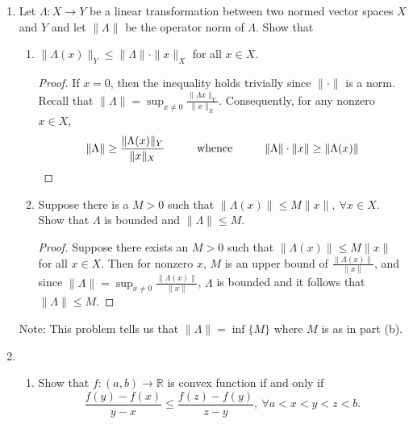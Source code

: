 \documentclass[11pt,oneside,english]{amsart}
\theoremstyle{definition}
\newcommand{\pspace}{\hspace{10mm}}
\newcommand{\MB}[1]{\mathbb{#1}}
\begin{document}
\rightline{\today}



\vspace{5mm}
\begin{enumerate}
\itemsep7mm



\item  Let $\Lambda: X\to Y$ be a linear transformation between two normed vector spaces $X$ and $Y$ and let $\|\Lambda\|$ be the operator norm of $\Lambda$. Show that 
\begin{enumerate}
\item $\|\Lambda(x)\|_Y\le \|\Lambda\|\cdot\|x\|_X$ for all $x\in X$. 

\begin{proof}
If $x=0$, then the inequality holds trivially since $\|\cdot\|$ is a norm. Recall that $\|\Lambda\|=\sup_{x\neq 0}\frac{\|\Lambda x\|_Y}{\|x\|_X}$. Consequently, for any nonzero $x\in X$,
\[
\|\Lambda\|\geq\frac{\|\Lambda (x)\|_Y}{\|x\|_X}\pspace\text{whence}\pspace\|\Lambda\|\cdot\|x\|\geq \|\Lambda(x)\|
\]
\end{proof}

\item Suppose there is a $M>0$ such that $\|\Lambda(x)\|\le M\|x\|,\ \forall x\in X.$ Show that $\Lambda$ is bounded and $\|\Lambda\|\le M$.

\begin{proof}
Suppose there exists an $M>0$ such that $\|\Lambda(x)\|\leq M\|x\|$ for all $x\in X$. Then for nonzero $x$, $M$ is an upper bound of $\frac{\|\Lambda(x)\|}{\|x\|}$, and since $\|\Lambda\|=\sup_{x\neq0}\frac{\|\Lambda(x)\|}{\|x\|}$, $\Lambda$ is bounded and it follows that $\|\Lambda\|\leq M$.
\end{proof}
\end{enumerate}

Note: This problem tells us that $\|\Lambda\|=\inf\{M\}$ where $M$ is as in part (b).

\pagebreak

\item \begin{enumerate}\itemsep7mm \item Show that $f:(a,b)\to\MB{R}$ is convex function if and only if 
\[
\frac{f(y)-f(x)}{y-x}\le \frac{f(z)-f(y)}{z-y},\ \forall a<x<y<z<b.
\]


\end{enumerate}
\end{enumerate}
\end{document}
